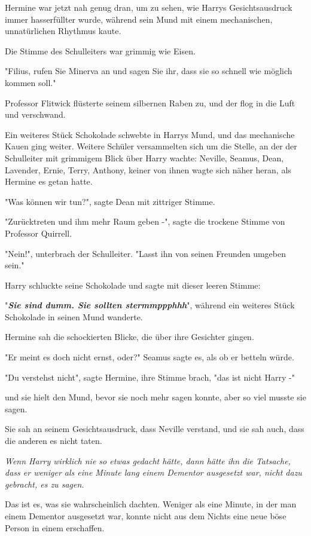 {Hermine war jetzt nah genug dran, um zu sehen, wie Harrys Gesichtsausdruck immer hasserfüllter wurde, während sein Mund mit einem mechanischen, unnatürlichen Rhythmus kaute.

Die Stimme des Schulleiters war grimmig wie Eisen.

"Filius, rufen Sie Minerva an und sagen Sie ihr, dass sie so schnell wie möglich kommen soll."

Professor Flitwick flüsterte seinem silbernen Raben zu, und der flog in die Luft und verschwand.

Ein weiteres Stück Schokolade schwebte in Harrys Mund, und das mechanische Kauen ging weiter. Weitere Schüler versammelten sich um die Stelle, an der der Schulleiter mit grimmigem Blick über Harry wachte: Neville, Seamus, Dean, Lavender, Ernie, Terry, Anthony, keiner von ihnen wagte sich näher heran, als Hermine es getan hatte.

"Was können wir tun?", sagte Dean mit zittriger Stimme.

"Zurücktreten und ihm mehr Raum geben -", sagte die trockene Stimme von Professor Quirrell.

"Nein!", unterbrach der Schulleiter. "Lasst ihn von seinen Freunden umgeben sein."

Harry schluckte seine Schokolade und sagte mit dieser leeren Stimme:

"\textbf{\emph{Sie sind dumm. Sie sollten stermmppphhh}}", während ein weiteres Stück Schokolade in seinen Mund wanderte.

Hermine sah die schockierten Blicke, die über ihre Gesichter gingen.

"Er meint es doch nicht ernst, oder?" Seamus sagte es, als ob er betteln würde.

"Du verstehst nicht", sagte Hermine, ihre Stimme brach, "das ist nicht Harry -"

und sie hielt den Mund, bevor sie noch mehr sagen konnte, aber so viel musste sie sagen.

Sie sah an seinem Gesichtsausdruck, dass Neville verstand, und sie sah auch, dass die anderen es nicht taten.

\emph{Wenn Harry wirklich nie so etwas gedacht hätte, dann hätte ihn die Tatsache, dass er weniger als eine Minute lang einem Dementor ausgesetzt war, nicht dazu gebracht, es zu sagen.}

Das ist es, was sie wahrscheinlich dachten. Weniger als eine Minute, in der man einem Dementor ausgesetzt war, konnte nicht aus dem Nichts eine neue böse Person in einem erschaffen.

}
